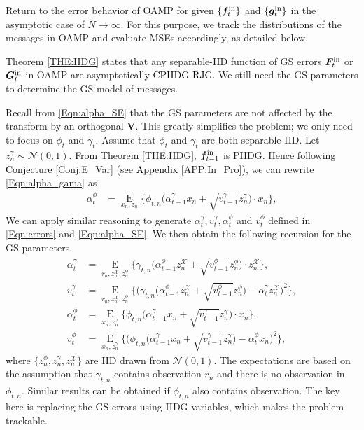 \documentclass[journal]{IEEEtran}
\newcommand{\mr}{\mathrm}
\newcommand{\BS}{\begin{subequations}}
\newcommand{\ES}{\end{subequations}}
\renewcommand{\bf}{\bm}
\renewcommand{\cal}{\mathcal}
\newcommand{\LL}[1]{\textcolor{black}{#1}}
\newcommand{\LLC}[1]{\textcolor{black}{#1}}%
\begin{document}
Return to the error behavior of OAMP for given $\{\bf{f}_t^{\rm in}\}$ and $\{\bf{g}_t^{\rm in}\}$ in the asymptotic case of $N\to \infty$. For this purpose, we track the distributions of the messages in OAMP and evaluate MSEs accordingly, as detailed below. 

Theorem \ref{THE:IIDG} states that any separable-IID function of GS errors $\bf{F}_t^{\rm in}$ or $\bf{G}_t^{\rm in}$ in OAMP are asymptotically \LLC{CPIIDG-RJG}. We still need the GS parameters to determine the GS model of messages.
 
 Recall from \eqref{Eqn:alpha_SE} that the GS parameters are not affected by the transform by an orthogonal $\bf{V}$. This greatly simplifies the problem; we only need to focus on $\phi_t$ and $\gamma_t$. Assume that $\phi_t$ and $\gamma_t$ are both separable-IID. Let $z_n^\gamma\sim {\cal{N}}(0, 1)$. From  Theorem \ref{THE:IIDG}, $\bf{f}_{t-1}^{\rm in}$ is PIIDG. Hence following \LL{Conjecture \ref{Conj:E_Var} (see Appendix \ref{APP:In_Pro})}, we can rewrite \eqref{Eqn:alpha_gama} as 
\begin{align} 
\alpha^\phi_{t} &=  \mathop\mr{E}\limits_{x_n, z_n }\Big\{\phi_{t,n}\big(\alpha^\gamma_{t-1}x_n + \sqrt{v_{t-1}^{\gamma}}z_n^\gamma\big)\cdot  x_n \Big\},\label{Eqn:exp_alp}
\end{align}  
We can apply similar reasoning to generate  $\alpha_{t}^{\!\gamma},v_{t}^{\!\gamma},\alpha_{t}^{\!\phi}$ and  $v_{t}^{\!\phi}$ defined in \eqref{Eqn:errors} and \eqref{Eqn:alpha_SE}. We then obtain the following recursion for the GS parameters. 
\BS\label{Eqn:MSE_phi_IDDG}\begin{align}
 \alpha_{t}^{\!\gamma}  &= \!\!\mathop\mr{E}\limits_{r_n,z_n^{\mathcal{X}},z^\phi_n}\!\Big\{\gamma_{t,n}\big(\alpha_{t-1}^{\!\phi} z_n^{\mathcal{X}} \!+\! \sqrt{\! v^{\phi}_{t-1}}z^\phi_n\big) \cdot z_n^{\mathcal{X}} \Big\},\label{Eqn:MSE_phi_IDDG1}\\ 
 v^{\!\gamma}_{t} & =  \!\!  \mathop\mr{E}\limits_{r_n,z_n^{\mathcal{X}}, z^\phi_n}\!\Big\{\Big( \gamma_{t,n}\big(\alpha_{t-1}^{\!\phi}\! z_n^{\mathcal{X}}\!\!+\!\sqrt{\!v^{\phi}_{t-1}} {z}^\phi_n\big)\!-\!\alpha_{t}^{\!\gamma} z_n^{\mathcal{X}}\Big)^2\Big\},\label{Eqn:MSE_phi_IDDG2} \\
\alpha_{t}^{\!\phi} &= \!\! \mathop\mr{E}\limits_{x_n, z^\gamma_n}\Big\{  \phi_{t,n}\big(\alpha_{t-1}^{\!\gamma} {x}_n \!+\! \sqrt{\! v^{\!\gamma}_{t-1}} {z}^\gamma_n \big)\cdot  {{x}_n}\Big\},\\ 
v^{\phi}_{t}\! &= \!\! \mathop\mr{E}\limits_{x_n, z^\gamma_n}\! \Big\{ \Big( \phi_{t,n}\big(\alpha_{t-1}^{\!\gamma} {x}_n \!+\! \sqrt{\!v^{{\!\gamma}}_{t-1}} {z}^\gamma_n \big)\! -\!\alpha_{t}^{\!\phi} {x}_n \Big)^2 \Big\},
\end{align}\ES   
where $\{z_n^\phi,z_n^\gamma, z_n^{\mathcal{X}}\}$ are IID drawn from ${\cal{N}}(0, 1)$. The expectations are based on the assumption that $\gamma_{t,n}$ contains observation $r_n$ and there is no observation in $\phi_{t,n}$. Similar results can be obtained if $\phi_{t,n}$ also contains observation. The key here is replacing the GS errors using IIDG variables, which makes the problem trackable. %
	
\end{document}
